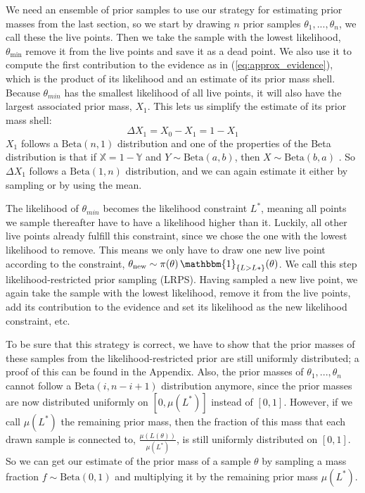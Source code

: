 \documentclass[12pt, a4paper]{report}
\begin{document}
We need an ensemble of prior samples to use our strategy for estimating prior masses from the last section, so we start by drawing $n$ prior samples $\theta_1, ..., \theta_n$, we call these the live points.
Then we take the sample with the lowest likelihood, $\theta_{\textrm{min}}$ remove it from the live points and save it as a dead point.
We also use it to compute the first contribution to the evidence as in (\ref{eq:approx_evidence}), which is the product of its likelihood and an estimate of its prior mass shell.
Because $\theta_{min}$ has the smallest likelihood of all live points, it will also have the largest associated prior mass, $X_1$. 
This lets us simplify the estimate of its prior mass shell:
$$
    \Delta X_1 = X_0 - X_1 = 1 - X_1
$$
$X_1$ follows a $\textrm{Beta}(n,1)$ distribution and one of the properties of the Beta distribution is that if $\mathbb{X} = 1 - \mathbb{Y}$ and $Y \sim \textrm{Beta}(a,b)$, then $X \sim \textrm{Beta}(b,a)$ \cite[5.17.2.]{beta_dist}.
So $\Delta X_1$ follows a $\textrm{Beta}(1,n)$ distribution, and we can again estimate it either by sampling or by using the mean.

The likelihood of $\theta_{min}$ becomes the likelihood constraint $L^*$, meaning all points we sample thereafter have to have a likelihood higher than it.
Luckily, all other live points already fulfill this constraint, since we chose the one with the lowest likelihood to remove.
This means we only have to draw one new live point according to the constraint, $\theta_{\textrm{new}} \sim \pi(\theta) \, \mathbbm{1}_{\{L > L*\}}(\theta)$.
We call this step likelihood-restricted prior sampling (LRPS).
Having sampled a new live point, we again take the sample with the lowest likelihood, remove it from the live points, add its contribution to the evidence and set its likelihood as the new likelihood constraint, etc.

To be sure that this strategy is correct, we have to show that the prior masses of these samples from the likelihood-restricted prior are still uniformly distributed; a proof of this can be found in the Appendix.
Also, the prior masses of $\theta_1, ..., \theta_n$ cannot follow a $\textrm{Beta}(i, n-i+1)$ distribution anymore, since the prior masses are now distributed uniformly on $[0,\mu(L^*)]$ instead of $[0,1]$.
However, if we call $\mu(L^*)$ the remaining prior mass, then the fraction of this mass that each drawn sample is connected to, $\frac{\mu(L(\theta))}{\mu(L^*)}$, is still uniformly distributed on $[0,1]$.
So we can get our estimate of the prior mass of a sample $\theta$ by sampling a mass fraction $f \sim \textrm{Beta}(0,1)$ and multiplying it by the remaining prior mass $\mu(L^*)$.
\end{document}
